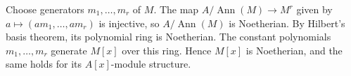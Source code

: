 Choose generators $m_1,\ldots,m_r$ of $M$. The map $A/\operatorname{Ann}(M)\to M^r$ given by $a\mapsto(am_1,\ldots,am_r)$ is injective, so $A/\operatorname{Ann}(M)$ is Noetherian. By Hilbert's basis theorem, its polynomial ring is Noetherian. The constant polynomials $m_1,\ldots,m_r$ generate $M[x]$ over this ring. Hence $M[x]$ is Noetherian, and the same holds for its $A[x]$-module structure.
